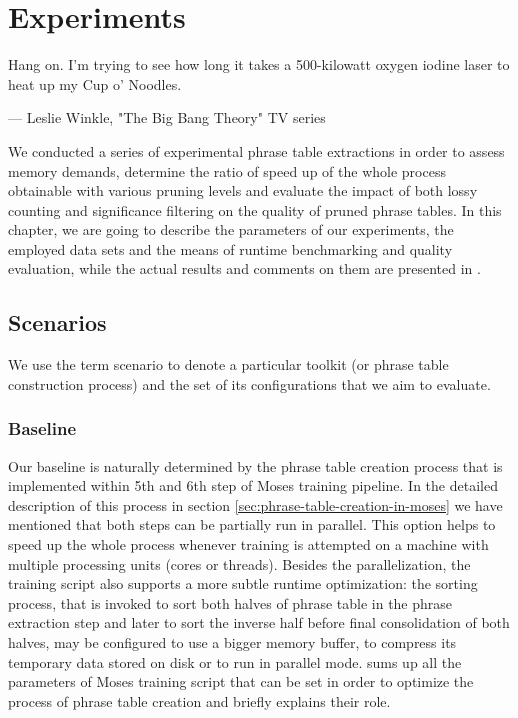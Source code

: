 \chapter{Experiments}
\label{chap:experiments}

\setlength{\epigraphwidth}{1.0\textwidth}
\epigraph{Hang on. I'm trying to see how long it takes a 500-kilowatt oxygen iodine laser to heat up my Cup o' Noodles.}{--- Leslie Winkle, "The Big Bang Theory" TV series}

We conducted a series of experimental phrase table extractions in order to
assess \eppex{} memory demands, determine the ratio of speed up of the whole
process obtainable with various pruning levels and evaluate the impact of both
lossy counting and significance filtering on the quality of pruned phrase tables.
In this chapter, we are going to describe the parameters of our experiments,
the employed data sets and the means of runtime benchmarking and quality
evaluation, while the actual results and comments on them are presented in
.

\section{Scenarios}

We use the term scenario to denote a particular toolkit (or phrase table construction process)
and the set of its configurations that we aim to evaluate.

\subsection{Baseline}

Our baseline is naturally determined by the phrase table creation process
that is implemented within 5th and 6th step of Moses training pipeline.
In the detailed description of this process in section \ref{sec:phrase-table-creation-in-moses}
we have mentioned that both steps can be partially run in parallel.
This option helps to speed up the whole process whenever training is
attempted on a machine with multiple processing units (cores or threads).
Besides the parallelization, the training script also supports a more subtle
runtime optimization: the sorting process, that is invoked to sort both halves
of phrase table in the phrase extraction step and later to sort the inverse
half before final consolidation of both halves, may be configured to use a bigger
memory buffer, to compress its temporary data stored on disk or to run in parallel mode.
 sums up all the parameters of Moses
training script that can be set in order to optimize the process of phrase
table creation and briefly explains their role.

